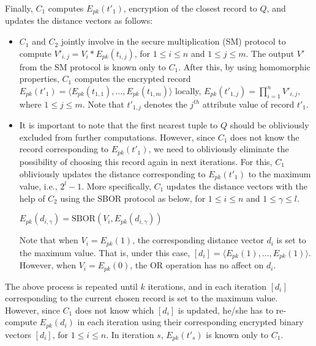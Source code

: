 \documentclass{article}
\begin{document}
Finally, $C_1$ computes $E_{pk}(t'_1)$, encryption of the closest record 
to $Q$, and updates the distance vectors as follows: 
\begin{itemize}
\item $C_1$ and $C_2$ jointly involve in the secure multiplication (SM) protocol to compute 
$V'_{i,j} =  V_i \ast E_{pk}(t_{i,j})$, for $1 \le i \le n$ and $1 \le j \le m$.  The output $V'$ from the SM protocol is known only 
to $C_1$. After this, by using homomorphic properties, $C_1$ computes the 
encrypted record $E_{pk}(t'_1) = \langle E_{pk}(t_{1,1}), \ldots, E_{pk}(t_{1,m})\rangle$ locally, 
$E_{pk}(t'_{1,j})= \prod_{i=1}^n V'_{i,j}$, where $1 \le j \le m$. Note that $t'_{1,j}$ 
denotes the $j^{th}$ attribute value of record $t'_1$.
\item It is important to note that the first nearest tuple to $Q$ should be 
obliviously excluded from further computations. However, since $C_1$ does not 
know the record corresponding to $E_{pk}(t'_1)$, we need to obliviously eliminate 
the possibility of choosing this record again in next iterations. For this, 
$C_1$ obliviously updates the distance corresponding to $E_{pk}(t'_1)$  
to the maximum value, i.e., $2^l-1$. More specifically, $C_1$ updates the distance vectors 
with the help of $C_2$ using the SBOR protocol as below, for $1 \le i \le n$ and $1 \le \gamma \le l$.
\begin{center}$E_{pk}(d_{i,\gamma}) = \textrm{SBOR}(V_i, E_{pk}(d_{i,\gamma}))$\end{center}
Note that when $V_i = E_{pk}(1)$, the corresponding distance vector $d_i$ is set 
to the maximum value. That is, under this case, $[d_i] = \langle E_{pk}(1), \ldots, E_{pk}(1)\rangle $. 
However, when $V_i = E_{pk}(0)$, the OR operation has no affect on $d_i$. 
\end{itemize} 
The above process is repeated until $k$ iterations, and in each iteration $[d_i]$ corresponding 
to the current chosen record is set to the maximum value. However, since $C_1$ does 
not know which $[d_i]$ is updated, he/she has to re-compute $E_{pk}(d_i)$ in each iteration using 
their corresponding encrypted binary vectors $[d_i]$, for $1 \le i \le n$. 
In iteration $s$, $E_{pk}(t'_s)$ is known only to $C_1$.
\end{document}
